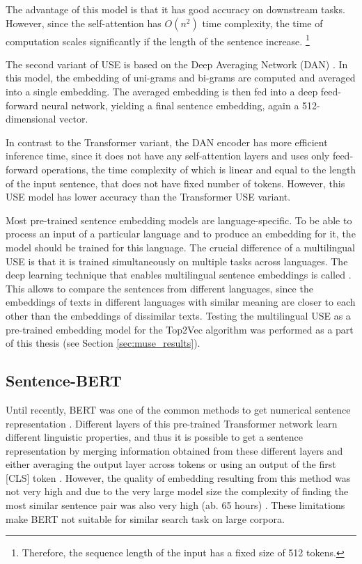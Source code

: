 \documentclass[fontsize=12pt,a4paper,twoside,openany]{scrbook}
\begin{document}
The advantage of this model is that it has good accuracy on downstream tasks. However, since the self-attention has \(O(n^2)\) time complexity, the time of computation scales significantly if the length of the sentence increase. \footnote{Therefore, the sequence length of the input has a fixed size of 512 tokens.}

The second variant of USE is based on the Deep Averaging Network (DAN) \parencite{Iyyer15}. In this model, the embedding of uni-grams and bi-grams are computed and averaged into a single embedding. The averaged embedding is then fed into a deep feed-forward neural network, yielding a final sentence embedding, again a 512-dimensional vector.

In contrast to the Transformer variant, the DAN encoder has more efficient inference time, since it does not have any self-attention layers and uses only feed-forward operations, the time complexity of which is linear and equal to the length of the input sentence, that does not have fixed number of tokens. However, this USE model has lower accuracy than the Transformer USE variant. 

Most pre-trained sentence embedding models are language-specific. To be able to process an input of a particular language and to produce an embedding for it, the model should be trained for this language. The crucial difference of a multilingual USE is that it is trained simultaneously on multiple tasks across languages. The deep learning technique that enables multilingual sentence embeddings is called  \parencite{Chidambaram19}. This allows to compare the sentences from different languages, since the embeddings of texts in different languages with similar meaning are closer to each other than the embeddings of dissimilar texts. 
Testing the multilingual USE as a pre-trained embedding model for the Top2Vec algorithm was performed as a part of this thesis (see Section \ref{sec:muse_results}).

\subsection{Sentence-BERT}
\label{sec:sbert}

Until recently, BERT was one of the common methods to get numerical sentence representation \parencite{Devlin19}. Different layers of this pre-trained Transformer network learn different linguistic properties, and thus it is possible to get a sentence representation by merging information obtained from these different layers and either averaging the output layer across tokens or using an output of the first [CLS] token \parencite{Wang20}. However, the quality of embedding resulting from this method was not very high and due to the very large model size the complexity of finding the most similar sentence pair was also very high (ab. 65 hours) \parencite{Reimers19}. These limitations make BERT not suitable for similar search task on large corpora.
\end{document}
